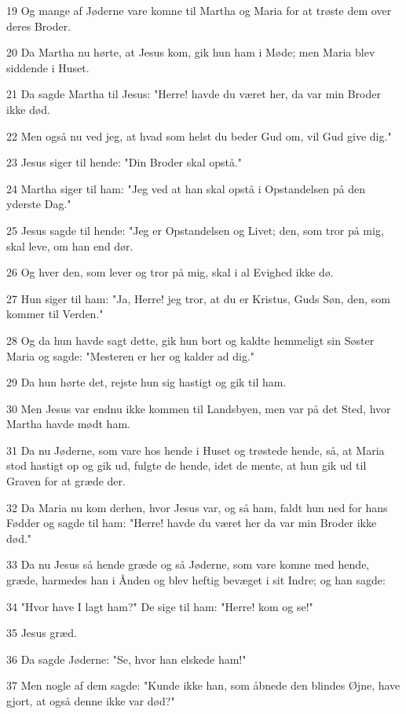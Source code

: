 \par 19 Og mange af Jøderne vare komne til Martha og Maria for at trøste dem over deres Broder.
\par 20 Da Martha nu hørte, at Jesus kom, gik hun ham i Møde; men Maria blev siddende i Huset.
\par 21 Da sagde Martha til Jesus: "Herre! havde du været her, da var min Broder ikke død.
\par 22 Men også nu ved jeg, at hvad som helst du beder Gud om, vil Gud give dig."
\par 23 Jesus siger til hende: "Din Broder skal opstå."
\par 24 Martha siger til ham: "Jeg ved at han skal opstå i Opstandelsen på den yderste Dag."
\par 25 Jesus sagde til hende: "Jeg er Opstandelsen og Livet; den, som tror på mig, skal leve, om han end dør.
\par 26 Og hver den, som lever og tror på mig, skal i al Evighed ikke dø.
\par 27 Hun siger til ham: "Ja, Herre! jeg tror, at du er Kristus, Guds Søn, den, som kommer til Verden."
\par 28 Og da hun havde sagt dette, gik hun bort og kaldte hemmeligt sin Søster Maria og sagde: "Mesteren er her og kalder ad dig."
\par 29 Da hun hørte det, rejste hun sig hastigt og gik til ham.
\par 30 Men Jesus var endnu ikke kommen til Landsbyen, men var på det Sted, hvor Martha havde mødt ham.
\par 31 Da nu Jøderne, som vare hos hende i Huset og trøstede hende, så, at Maria stod hastigt op og gik ud, fulgte de hende, idet de mente, at hun gik ud til Graven for at græde der.
\par 32 Da Maria nu kom derhen, hvor Jesus var, og så ham, faldt hun ned for hans Fødder og sagde til ham: "Herre! havde du været her da var min Broder ikke død."
\par 33 Da nu Jesus så hende græde og så Jøderne, som vare komne med hende, græde, harmedes han i Ånden og blev heftig bevæget i sit Indre; og han sagde:
\par 34 "Hvor have I lagt ham?" De sige til ham: "Herre! kom og se!"
\par 35 Jesus græd.
\par 36 Da sagde Jøderne: "Se, hvor han elskede ham!"
\par 37 Men nogle af dem sagde: "Kunde ikke han, som åbnede den blindes Øjne, have gjort, at også denne ikke var død?"
